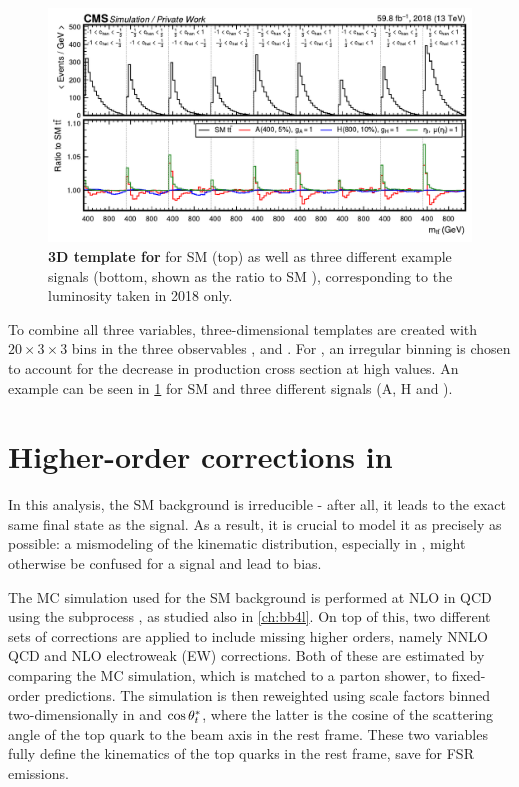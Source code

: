 \begin{figure}[t]
    \centering
    \includegraphics[width=0.99\linewidth]{figures/ah/mttchelchan.pdf}
    \caption{\textbf{3D template for \mttchelchan} for SM \ttbar (top) as well as three different example signals (bottom, shown as the ratio to SM \ttbar), corresponding to the luminosity taken in 2018 only.}
    \label{fig:ah:mttchelchan}
\end{figure}


To combine all three variables, three-dimensional templates are created with $20 \times 3 \times 3$ bins in the three observables \mtt, \chel and \chan. For \mtt, an irregular binning is chosen to account for the decrease in production cross section at high values. An example can be seen in \cref{fig:ah:mttchelchan} for SM \ttbar and three different signals (A, H and \etat).

\section{Higher-order corrections in \ttbartitle}
\label{sec:ah:ttbarweights}

In this analysis, the SM \ttbar background is irreducible - after all, it leads to the exact same final state as the signal. As a result, it is crucial to model it as precisely as possible: a mismodeling of the \ttbar kinematic distribution, especially in \mtt, might otherwise be confused for a signal and lead to bias.

The MC simulation used for the SM \ttbar background is performed at NLO in QCD using the \powhegvtwo subprocess \hvq, as studied also in \cref{ch:bb4l}. On top of this, two different sets of corrections are applied to include missing higher orders, namely NNLO QCD and NLO electroweak (EW) corrections. Both of these are estimated by comparing the MC simulation, which is matched to a parton shower, to fixed-order predictions. The simulation is then reweighted using scale factors binned two-dimensionally in \mtt and $\cos \theta^*_t$, where the latter is the cosine of the scattering angle of the top quark to the beam axis in the \ttbar rest frame. These two variables fully define the kinematics of the top quarks in the \ttbar rest frame, save for FSR emissions.%

